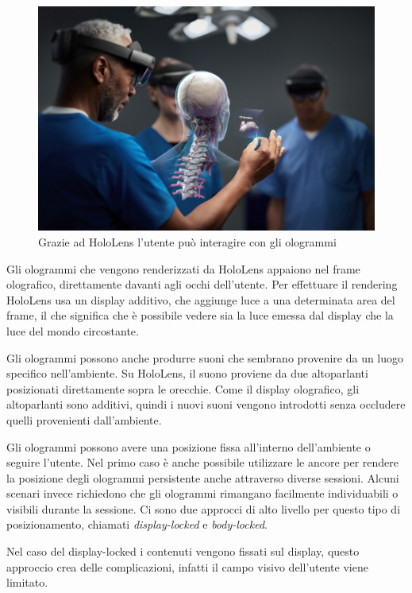 \begin{figure}[t]
    \centering
    \includegraphics[width=\textwidth]{images/hologram.jpg}
    \caption{Grazie ad HoloLens l'utente può interagire con gli ologrammi}
    \label{fig:figure21}
\end{figure}

Gli ologrammi che vengono renderizzati da HoloLens appaiono nel frame olografico, direttamente davanti agli occhi dell’utente. Per effettuare il rendering HoloLens usa un display additivo, che aggiunge luce a una determinata area del frame, il che significa che è possibile vedere sia la luce emessa dal display che la luce del mondo circostante.

Gli ologrammi possono anche produrre suoni che sembrano provenire da un luogo specifico nell’ambiente. Su HoloLens, il suono proviene da due altoparlanti posizionati direttamente sopra le orecchie. Come il display olografico, gli altoparlanti sono additivi, quindi i nuovi suoni vengono introdotti senza occludere quelli provenienti dall'ambiente.

Gli ologrammi possono avere una posizione fissa all’interno dell’ambiente o seguire l’utente. Nel primo caso è anche possibile utilizzare le ancore per rendere la posizione degli ologrammi persistente anche attraverso diverse sessioni. 
Alcuni scenari invece richiedono che gli ologrammi rimangano facilmente individuabili o visibili durante la sessione. Ci sono due approcci di alto livello per questo tipo di posizionamento, chiamati \textit{display-locked} e \textit{body-locked}. 

Nel caso del display-locked i contenuti vengono fissati sul display, questo approccio crea delle complicazioni, infatti il campo visivo dell’utente viene limitato. 

